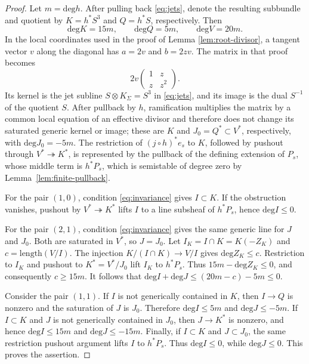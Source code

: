 \documentclass[oneside,11pt]{amsart}
\theoremstyle{definition}
\theoremstyle{remark}
\numberwithin{thm}{section}
\numberwithin{equation}{section}
\begin{document}
\begin{proof}
Let $m=\mathrm{deg} h$.  After pulling back \eqref{eq:jets}, denote the resulting subbundle and quotient by $K=h^*S^3$ and $Q=h^*S$, respectively.
Then
\[
 \mathrm{deg} K=15m,\qquad\mathrm{deg} Q=5m,\qquad\mathrm{deg} V=20m.
\]
In the local coordinates used in the proof of Lemma \ref{lem:root-divisor}, a tangent vector $v$ along the diagonal has $a=2v$ and $b=2zv$.  The matrix in that proof becomes
\[
 2v\begin{pmatrix}1&z\\ z&z^2\end{pmatrix}.
\]
Its kernel is the jet subline $S\otimes K_\Sigma=S^3$ in
\eqref{eq:jets}, and its image is the dual $S^{-1}$ of the quotient $S$. After pullback by $h$, ramification multiplies the matrix by a common local equation of an effective divisor and therefore does not change its saturated generic kernel or image; these are $K$ and $J_0=Q^*\subset V^*$, respectively, with $\mathrm{deg}J_0=-5m$. The restriction of $(j\circ h)^*e_s$ to $K$, followed by pushout through $V^*\twoheadrightarrow K^*$, is represented by the pullback of the defining extension of $P_s$, whose middle term is $h^*P_s$, which is semistable of degree zero by Lemma~\ref{lem:finite-pullback}.


For the pair $(1,0)$, condition \eqref{eq:invariance} gives $I\subset K$.  If the obstruction vanishes, pushout by $V^*\twoheadrightarrow K^*$ lifts $I$ to a line subsheaf of $h^*P_s$, hence $\mathrm{deg} I\leq0$.

For the pair $(2,1)$, condition \eqref{eq:invariance} gives the same generic line for $J$ and $J_0$.  Both are saturated in $V^*$, so $J=J_0$.  Let $I_K=I\cap K=K(-Z_K)$ and $c=\mathrm{length}(V/I)$.  The injection $K/(I\cap K)\longrightarrow V/I$ gives $\mathrm{deg} Z_K\leq c$. Restriction to $I_K$ and pushout to $K^*=V^*/J_0$ lift $I_K$ to $h^*P_s$. Thus $15m-\mathrm{deg} Z_K\leq0$, and consequently $c\geq15m$.  It follows that $\mathrm{deg} I+\mathrm{deg} J\leq(20m-c)-5m\leq0$.

Consider the pair $(1,1)$.  If $I$ is not generically contained in $K$, then $I\to Q$ is nonzero and the saturation of $J$ is $J_0$.  Therefore $\mathrm{deg} I\leq5m$ and $\mathrm{deg} J\leq-5m$. If $I\subset K$ and $J$ is not generically contained in $J_0$, then $J\to K^*$ is nonzero, and hence $\mathrm{deg} I\leq15m$ and $\mathrm{deg} J\leq-15m$.
Finally, if $I\subset K$ and $J\subset J_0$, the same restriction pushout argument lifts $I$ to $h^*P_s$.  Thus $\mathrm{deg} I\leq0$, while $\mathrm{deg} J\leq0$.  This proves the assertion.
\end{proof}
\end{document}
